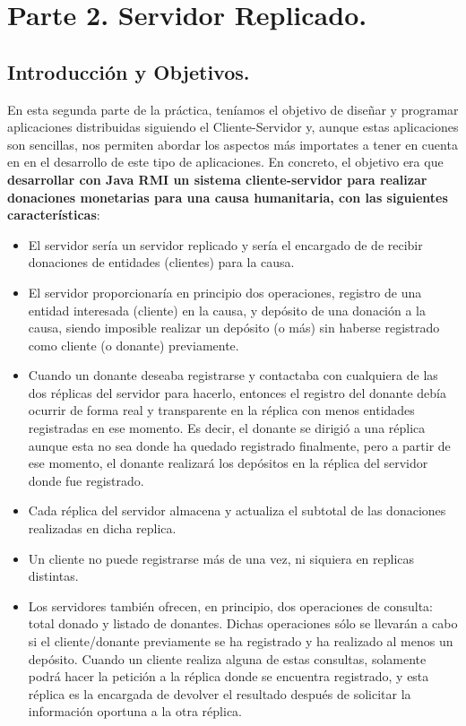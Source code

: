 \documentclass[a4paper,12pt]{article}
\begin{document}
	\section{Parte 2. Servidor Replicado.}
	
		\subsection{Introducción y Objetivos.}
			En esta segunda parte de la práctica, teníamos el objetivo de diseñar y programar aplicaciones distribuidas siguiendo el Cliente-Servidor y, aunque estas aplicaciones son sencillas, nos permiten abordar los aspectos más importates a tener en cuenta en en el desarrollo de este tipo de aplicaciones. En concreto, el objetivo era que \textbf{desarrollar con Java RMI un sistema cliente-servidor para realizar donaciones monetarias para una causa humanitaria, con las siguientes características}:
			
			\begin{itemize}
				\item El servidor sería un servidor replicado y sería el encargado de de recibir donaciones de entidades (clientes) para la causa.
				\item El servidor proporcionaría en principio dos operaciones, registro de una entidad interesada (cliente) en la causa, y depósito de una donación a la causa, siendo imposible realizar un depósito (o más) sin haberse registrado como cliente (o donante) previamente.
				\item Cuando un donante deseaba registrarse y contactaba con cualquiera de las dos réplicas del servidor para hacerlo, entonces el registro del donante debía ocurrir de forma real y transparente en la réplica con menos entidades registradas en ese momento. Es decir, el donante se  dirigió a una réplica aunque esta no sea donde ha quedado registrado finalmente, pero a partir de ese momento, el donante realizará los depósitos en la réplica del servidor donde fue registrado.
				\item Cada réplica del servidor almacena y actualiza el subtotal de las donaciones realizadas en dicha replica.
				\item Un cliente no puede registrarse más de una vez, ni siquiera en replicas distintas.
				\item Los servidores también ofrecen, en principio, dos operaciones de consulta: total donado y listado de donantes. Dichas operaciones sólo se llevarán a cabo si el cliente/donante previamente se ha registrado y ha realizado al menos un depósito. Cuando un cliente realiza alguna de estas consultas, solamente podrá  hacer la petición a la réplica donde se encuentra registrado, y esta réplica es la encargada de devolver el resultado después de solicitar la información oportuna a la otra réplica.
			\end{itemize}
			
\end{document}
